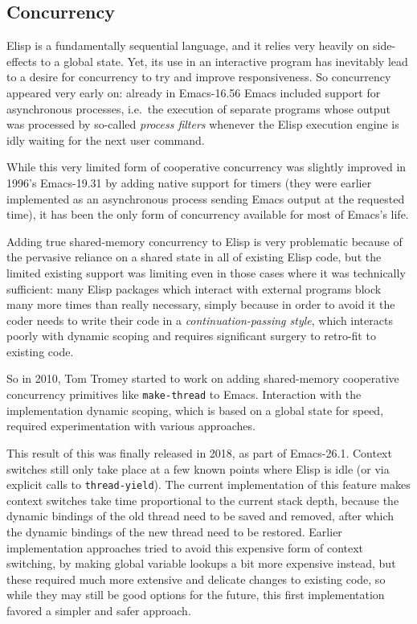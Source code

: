 \documentclass[format=acmsmall, review=false, screen=true]{acmart}
\newcommand \Elisp {Elisp}
\begin{document}
\subsection{Concurrency}

\Elisp{} is a fundamentally sequential language, and it relies very heavily
on side-effects to a global state.  Yet, its use in an interactive program
has inevitably lead to a desire for concurrency to try and improve
responsiveness.  So concurrency appeared very early on: already in
Emacs-16.56 Emacs included support for asynchronous processes, i.e.~the
execution of separate programs whose output was processed by so-called
\emph{process filters} whenever the \Elisp{} execution engine is idly
waiting for the next user command.

While this very limited form of cooperative concurrency was slightly
improved in 1996's Emacs-19.31 by adding native support for timers (they
were earlier implemented as an asynchronous process sending Emacs output at
the requested time), it has been the only form of concurrency available for
most of Emacs's life.

Adding true shared-memory concurrency to \Elisp{} is very problematic
because of the pervasive reliance on a shared state in all of existing
\Elisp{} code, but the limited existing support was limiting even in those
cases where it was technically sufficient: many \Elisp{} packages which
interact with external programs block many more times than really necessary,
simply because in order to avoid it the coder needs to write their code in
a \emph{continuation-passing style}, which interacts poorly with dynamic
scoping and requires significant surgery to retro-fit to existing code.

So in 2010, Tom Tromey started to work on adding shared-memory cooperative
concurrency primitives like \texttt{make-thread} to Emacs.  Interaction with
the implementation dynamic scoping, which is based on a global state for
speed, required experimentation with various approaches.

This result of this was finally released in 2018, as part of Emacs-26.1.
Context switches still only take place at a few known points where \Elisp{}
is idle (or via explicit calls to \texttt{thread-yield}).  The current
implementation of this feature makes context switches take time proportional
to the current stack depth, because the dynamic bindings of the old thread
need to be saved and removed, after which the dynamic bindings of the new
thread need to be restored.  Earlier implementation approaches tried to
avoid this expensive form of context switching, by making global variable
lookups a bit more expensive instead, but these required much more extensive
and delicate changes to existing code, so while they may still be good
options for the future, this first implementation favored a simpler and
safer approach.
\end{document}
